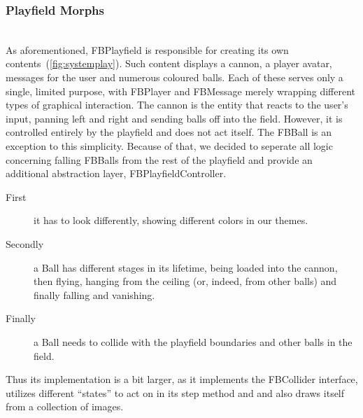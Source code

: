 \subsubsection{Playfield Morphs}~\\
As aforementioned, FBPlayfield is responsible for creating its own 
contents~(\ref{fig:systemplay}). Such content displays a cannon, a 
player avatar, messages for the user and numerous coloured balls. 
Each of these serves only a single, limited purpose, with FBPlayer 
and FBMessage merely wrapping different types of graphical interaction.
The cannon is the entity that reacts to the user's input, panning 
left and right and sending balls off into the field. However, it 
is controlled entirely by the playfield and does not act itself. 
The FBBall is an exception to this simplicity. 
Because of that, we decided to seperate all logic concerning falling
FBBalls from the rest of the playfield and provide an additional
abstraction layer, FBPlayfieldController.


\begin{description}
  \item[First]
    	it has to look 
	differently, showing different colors in our themes. 
  \item[Secondly]
    	a Ball has different stages in its lifetime, being 
	loaded into the cannon, then flying, hanging from the 
	ceiling (or, indeed, from other balls) and finally falling 
	and vanishing.
  \item[Finally]
    	a Ball needs to collide with the playfield boundaries and 
	other balls in the field.
\end{description}
Thus its implementation is a bit larger, as it implements the FBCollider 
interface, utilizes different ``states'' to act on in its step method and 
and also draws itself from a collection of images.
%
